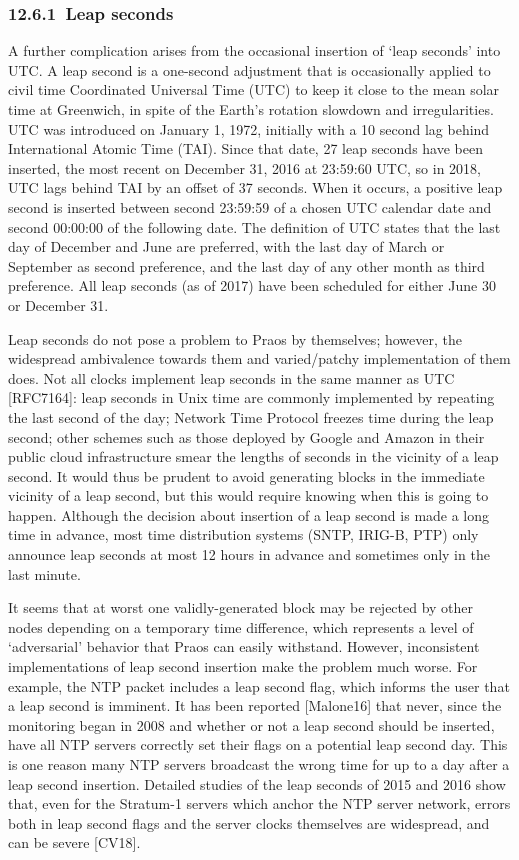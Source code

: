 \documentclass[]{article}
\begin{document}
\hypertarget{leap-seconds}{%
\subsubsection{​12.6.1​~Leap seconds}\label{leap-seconds}}

A further complication arises from the occasional insertion of `leap
seconds' into UTC. A leap second is a one-second adjustment that is
occasionally applied to civil time Coordinated Universal Time (UTC) to
keep it close to the mean solar time at Greenwich, in spite of the
Earth's rotation slowdown and irregularities. UTC was introduced on
January 1, 1972, initially with a 10 second lag behind International
Atomic Time (TAI). Since that date, 27 leap seconds have been inserted,
the most recent on December 31, 2016 at 23:59:60 UTC, so in 2018, UTC
lags behind TAI by an offset of 37 seconds. When it occurs, a positive
leap second is inserted between second 23:59:59 of a chosen UTC calendar
date and second 00:00:00 of the following date. The definition of UTC
states that the last day of December and June are preferred, with the
last day of March or September as second preference, and the last day of
any other month as third preference. All leap seconds (as of 2017) have
been scheduled for either June 30 or December 31.

Leap seconds do not pose a problem to Praos by themselves; however, the
widespread ambivalence towards them and varied/patchy implementation of
them does. Not all clocks implement leap seconds in the same manner as
UTC {[}RFC7164{]}: leap seconds in Unix time are commonly implemented by
repeating the last second of the day; Network Time Protocol freezes time
during the leap second; other schemes such as those deployed by Google
and Amazon in their public cloud infrastructure smear the lengths of
seconds in the vicinity of a leap second. It would thus be prudent to
avoid generating blocks in the immediate vicinity of a leap second, but
this would require knowing when this is going to happen. Although the
decision about insertion of a leap second is made a long time in
advance, most time distribution systems (SNTP, IRIG-B, PTP) only
announce leap seconds at most 12 hours in advance and sometimes only in
the last minute.

It seems that at worst one validly-generated block may be rejected by
other nodes depending on a temporary time difference, which represents a
level of `adversarial' behavior that Praos can easily withstand.
However, inconsistent implementations of leap second insertion make the
problem much worse. For example, the NTP packet includes a leap second
flag, which informs the user that a leap second is imminent. It has been
reported {[}Malone16{]} that never, since the monitoring began in 2008
and whether or not a leap second should be inserted, have all NTP
servers correctly set their flags on a potential leap second day. This
is one reason many NTP servers broadcast the wrong time for up to a day
after a leap second insertion. Detailed studies of the leap seconds of
2015 and 2016 show that, even for the Stratum-1 servers which anchor the
NTP server network, errors both in leap second flags and the server
clocks themselves are widespread, and can be severe {[}CV18{]}.
\end{document}
